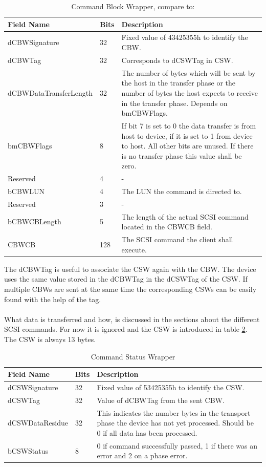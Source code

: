 \begin{table}[ht]
\caption{Command Block Wrapper, compare to: \cite{usb_ms_jan}}
\centering
\begin{tabular}{|l|l|p{9cm}|}
\hline\hline
\textbf{Field Name} & \textbf{Bits} & \textbf{Description}\\ \hline
dCBWSignature & 32 & Fixed value of 43425355h to identify the CBW. \\ \hline
dCBWTag & 32 & Corresponds to dCSWTag in CSW. \\ \hline
dCBWDataTransferLength & 32 & The number of bytes which will be sent by the host in the transfer phase or the number of bytes the host expects to receive in the transfer phase. Depends on bmCBWFlags. \\ \hline
bmCBWFlags & 8 & If bit 7 is set to 0 the data transfer is from host to device, if it is set to 1 from device to host. All other bits are unused. If there is no transfer phase this value shall be zero. \\ \hline
Reserved & 4 & - \\ \hline
bCBWLUN & 4 & The LUN the command is directed to. \\ \hline
Reserved & 3 & - \\ \hline
bCBWCBLength & 5 & The length of the actual SCSI command located in the CBWCB field. \\ \hline
CBWCB & 128 & The SCSI command the client shall execute. \\ \hline
\end{tabular}
\label{table:cbw}
\end{table}

The dCBWTag is useful to associate the CSW again with the CBW. The device uses the same value stored in the dCBWTag in the dCSWTag of the CSW. If multiple CBWs are sent at the same time the corresponding CSWs can be easily found with the help of the tag.
\\\\
What data is transferred and how, is discussed in the sections about the different SCSI commands. For now it is ignored and the CSW is introduced in table \ref{table:csw}. The CSW is always 13 bytes.

\begin{table}[ht]
\caption{Command Status Wrapper \cite{usb_ms_jan}}
\centering
\begin{tabular}{|l|l|p{9cm}|}
\hline\hline
\textbf{Field Name} & \textbf{Bits} & \textbf{Description}\\ \hline
dCSWSignature & 32 & Fixed value of 53425355h to identify the CSW. \\ \hline
dCSWTag & 32 & Value of dCBWTag from the sent CBW. \\ \hline
dCSWDataResidue & 32 & This indicates the number bytes in the transport phase the device has not yet processed. Should be 0 if all data has been processed. \\ \hline
bCSWStatus & 8 & 0 if command successfully passed, 1 if there was an error and 2 on a phase error. \\ \hline
\end{tabular}
\label{table:csw}
\end{table}

